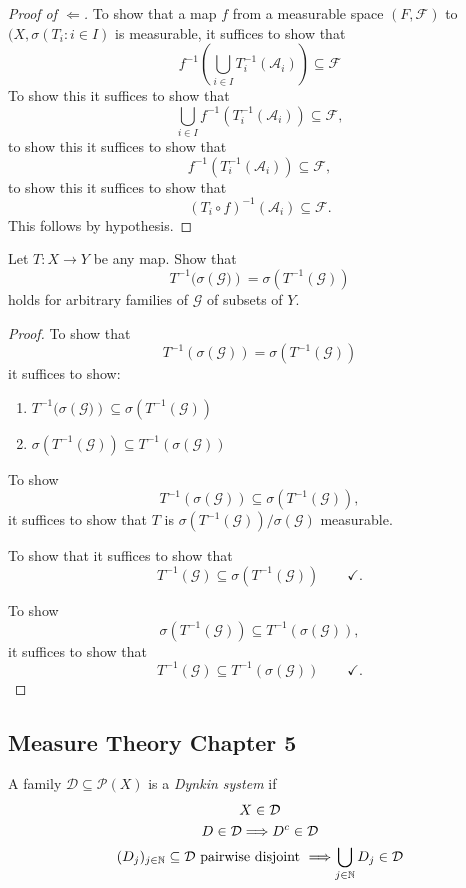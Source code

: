 \begin{proof}[Proof of $\Longleftarrow$]
To show that a map \(f\) from a measurable space \((F,\mathcal{F})\) to \((X,\sigma (T_{i}:i\in I)\) is measurable, it suffices to show that
\[
f^{-1}(\bigcup _{i\in I}T_{i}^{-1}(\mathcal{A}_{i}))\subseteq \mathcal{F}
\]
To show this it suffices to show that
\[
\bigcup _{i\in I}f^{-1}(T_{i}^{-1}(\mathcal{A}_{i}))\subseteq \mathcal{F},
\]
to show this it suffices to show that
\[
f^{-1}(T_{i}^{-1}(\mathcal{A}_{i}))\subseteq \mathcal{F},
\]
to show this it suffices to show that
\[
(T_{i}\circ f)^{-1}(\mathcal{A}_{i})\subseteq \mathcal{F}.
\]
This follows by hypothesis.
\end{proof}

\begin{thm}[Problem 7.8]
Let \(T:X\rightarrow Y\) be any map. Show that
\[
T^{-1}(\sigma (\mathcal{G)})=\sigma (T^{-1}(\mathcal{G}))
\]
holds for arbitrary families of \(\mathcal{G}\) of subsets of \(Y\).
\end{thm}

\begin{proof}
To show that
\[
T^{-1}(\sigma (\mathcal{G}))=\sigma (T^{-1}(\mathcal{G}))
\]
it suffices to show:

\begin{enumerate}
  \item \(T^{-1}(\sigma (\mathcal{G)})\subseteq \sigma (T^{-1}(\mathcal{G}))\)
  \item \(\sigma (T^{-1}(\mathcal{G}))\subseteq T^{-1}(\sigma (\mathcal{G}))\)
\end{enumerate}

To show
\[
T^{-1}(\sigma (\mathcal{G}))\subseteq \sigma (T^{-1}(\mathcal{G})),
\]
it suffices to show that
\(T\) is \(\sigma (T^{-1}(\mathcal{G}))/\sigma (\mathcal{G})\) measurable.

To show that it suffices to show that
\[
T^{-1}(\mathcal{G})\subseteq \sigma (T^{-1}(\mathcal{G})) \qquad \checkmark.
\]

To show
\[
\sigma (T^{-1}(\mathcal{G}))\subseteq T^{-1}(\sigma (\mathcal{G})),
\]
it suffices to show that
\[
T^{-1}(\mathcal{G})\subseteq T^{-1}(\sigma (\mathcal{G})) \qquad \checkmark.
\]
\end{proof}

\subsection{Measure Theory Chapter 5}
\begin{defn}
A family \(\mathcal{D}\subseteq \mathcal{P}(X)\) is a \emph{Dynkin system} if
\begin{gather*}
X\in \mathcal{D} \\
D\in \mathcal{D}\space \Longrightarrow \space D^c\in \mathcal{D} \\
(D_{j})_{j\in \Bbb{N}}\subseteq \mathcal{D} \text{ pairwise disjoint }\space \Longrightarrow \space \bigcup _{j\in \Bbb{N}}D_{j}\in \mathcal{D}
\end{gather*}
\end{defn}


